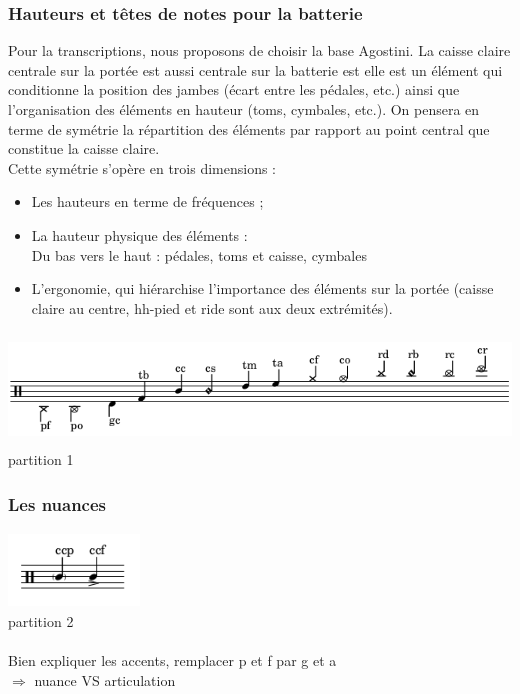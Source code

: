 \subsubsection{Hauteurs et têtes de notes pour la batterie}
Pour la transcriptions, nous proposons de choisir la base Agostini. La caisse claire centrale sur la portée est aussi centrale sur la batterie est elle est un élément qui conditionne la position des jambes (écart entre les pédales, etc.) ainsi que l’organisation des éléments en hauteur (toms, cymbales, etc.).
On pensera en terme de symétrie la répartition des éléments par rapport au point central que constitue la caisse claire.\\
Cette symétrie s’opère en trois dimensions :
\begin{itemize}
	\item Les hauteurs en terme de fréquences ;
	\item La hauteur physique des éléments :\\
	Du bas vers le haut : pédales, toms et caisse, cymbales
	\item L’ergonomie, qui hiérarchise l’importance des éléments sur la portée (caisse claire au centre, hh-pied et ride sont aux deux extrémités).
\end{itemize}


\includegraphics[height=30mm, width=155mm]{z_images/1_description_notation/notes.png}
partition 1
\subsubsection{Les nuances}
\includegraphics[height=20mm, width=35mm]{z_images/1_description_notation/nuances.png}\\
partition 2\\\\
Bien expliquer les accents, remplacer p et f par g et a\\
$\Rightarrow$ nuance VS articulation\


